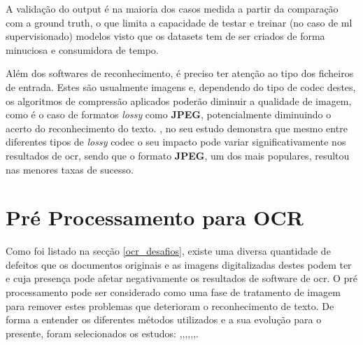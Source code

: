 A validação do output é na maioria dos casos medida a partir da comparação com a \gls{ground truth}, o que limita a capacidade de testar e treinar (no caso de \acrshort{ml} supervisionado) modelos visto que os datasets tem de ser criados de forma minuciosa e consumidora de tempo.

Além dos softwares de reconhecimento, é preciso ter atenção ao tipo dos ficheiros de entrada. Estes são usualmente imagens e, dependendo do tipo de \gls{codec} destes, os algoritmos de compressão aplicados poderão diminuir a qualidade de imagem, como é o caso de formatos \textit{lossy} como \textbf{JPEG}, potencialmente diminuindo o acerto do reconhecimento do texto. \cite{7367194}, no seu estudo demonstra que mesmo entre diferentes tipos de \textit{lossy} \gls{codec} o seu impacto pode variar significativamente nos resultados de \acrshort{ocr}, sendo que o formato \textbf{JPEG}, um dos mais populares, resultou nas menores taxas de sucesso.



\section{Pré Processamento para OCR}
\label{sec_pre_proc_ocr}


Como foi listado na secção \ref{ocr_desafios}, existe uma diversa quantidade de defeitos que os documentos originais e as imagens digitalizadas destes podem ter e cuja presença pode afetar negativamente os resultados de software de \acrshort{ocr}. 
O pré processamento pode ser considerado como uma fase de tratamento de imagem para remover estes problemas que deterioram o reconhecimento de texto. De forma a entender os diferentes métodos utilizados e a sua evolução para o presente, foram selecionados os estudos:  \citep{4283429},\citep{5277501},\citep{9187695},\citep{8545609},\citep{9791698},\citep{8368720},\citep{8269967}.

